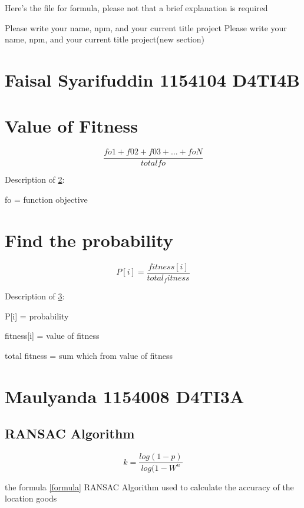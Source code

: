 Here's the file for formula, please not that a brief explanation is required

Please write your name, npm, and your current title project
Please write your name, npm, and your current title project(new section)

\section{Faisal Syarifuddin 1154104 D4TI4B}


\section{Value of Fitness}
    \label{fitness}
    \begin{equation}
        \frac{fo1 + f02 + f03 + ... + foN}{total fo}
    \end{equation}
    \par Description of \ref{fitness}:
    \par fo = function objective

\section{Find the probability}
    \label{ptobabilty}
    \begin{equation}
        P[i] = \frac{fitness[i]}{total_fitness}
    \end{equation}
    \par Description of \ref{ptobabilty}:
    \par P[i] = probability
    \par fitness[i] = value of fitness
    \par total fitness = sum which from value of fitness

\section{Maulyanda 1154008 D4TI3A}
\subsection{RANSAC Algorithm}
    \label{Formula}
    \begin{equation}
        k = \frac{log(1-p)}{log(1-W^n}
    \end{equation}

    the formula \ref{formula} RANSAC Algorithm used to calculate the accuracy of the location goods
